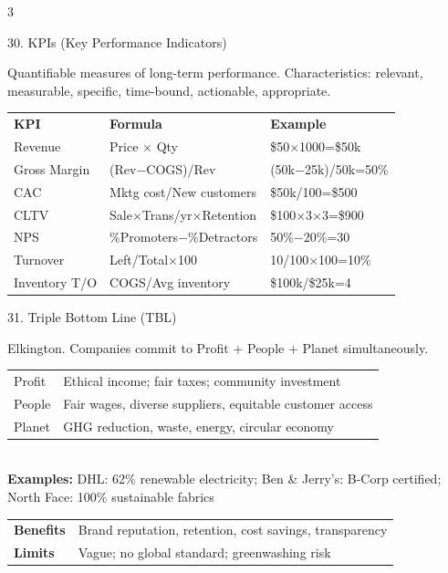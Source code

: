 \documentclass[7.5pt, letterpaper]{article}
\newcommand{\concept}[1]{%
  \vspace{2.5pt}%
  \noindent\colorbox{accent}{\parbox{\dimexpr\linewidth-2\fboxsep}{\fontsize{6.8pt}{7.5pt}\selectfont\bfseries\color{white}\strut #1\strut}}%
  \vspace{1pt}\par%
}
\newcommand{\kv}[2]{\noindent\textbf{#1:} #2\par}
\newcommand{\minitab}[1]{%
  \begingroup
  \fontsize{6.2pt}{7pt}\selectfont
  \setlength{\tabcolsep}{2pt}
  #1
  \endgroup
}
\begin{document}
\begin{multicols}{3}
\concept{30. KPIs (Key Performance Indicators)}
Quantifiable measures of long-term performance. Characteristics: relevant, measurable, specific, time-bound, actionable, appropriate.\\
\minitab{\begin{tabular}{@{}lll@{}}
\textbf{KPI} & \textbf{Formula} & \textbf{Example}\\
Revenue & Price $\times$ Qty & \$50$\times$1000=\$50k\\
Gross Margin & (Rev$-$COGS)/Rev & (50k$-$25k)/50k=50\%\\
CAC & Mktg cost/New customers & \$50k/100=\$500\\
CLTV & Sale$\times$Trans/yr$\times$Retention & \$100$\times$3$\times$3=\$900\\
NPS & \%Promoters$-$\%Detractors & 50\%$-$20\%=30\\
Turnover & Left/Total$\times$100 & 10/100$\times$100=10\%\\
Inventory T/O & COGS/Avg inventory & \$100k/\$25k=4\\
\end{tabular}}

\concept{31. Triple Bottom Line (TBL)}
Elkington. Companies commit to Profit + People + Planet simultaneously.\\
\minitab{\begin{tabular}{@{}ll@{}}
Profit & Ethical income; fair taxes; community investment\\
People & Fair wages, diverse suppliers, equitable customer access\\
Planet & GHG reduction, waste, energy, circular economy\\
\end{tabular}}\\
\kv{Examples}{DHL: 62\% renewable electricity; Ben \& Jerry's: B-Corp certified; North Face: 100\% sustainable fabrics}
\minitab{\begin{tabular}{@{}ll@{}}
\textbf{Benefits} & Brand reputation, retention, cost savings, transparency\\
\textbf{Limits} & Vague; no global standard; greenwashing risk\\
\end{tabular}}


\end{multicols}
\end{document}
